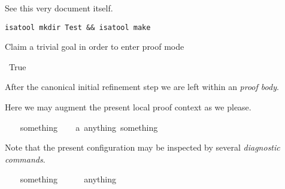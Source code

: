 %
\begin{isabellebody}%
\def\isabellecontext{Tutorial}%
\isamarkupfalse%
%
\isamarkuptrue%
%
\isamarkuptrue%
%
\isamarkuptrue%
%
\isamarkuptrue%
%
\isamarkuptrue%
%
\isamarkuptrue%
%
\isamarkuptrue%
%
\isamarkuptrue%
%
\isamarkuptrue%
%
\isamarkuptrue%
%
\isamarkuptrue%
%
\begin{isamarkuptext}%
See this very document itself.%
\end{isamarkuptext}%
\isamarkuptrue%
%
\isamarkuptrue%
%
\begin{isamarkuptext}%
\verb"isatool mkdir Test && isatool make"%
\end{isamarkuptext}%
\isamarkuptrue%
%
\isamarkuptrue%
%
\isamarkuptrue%
%
\begin{isamarkuptext}%
Claim a trivial goal in order to enter proof mode \isa{{\isasymdots}}%
\end{isamarkuptext}%
\isamarkuptrue%
\ True\isanewline
\isamarkupfalse%
\isamarkupfalse%
%
\begin{isamarkuptxt}%
After the canonical initial refinement step we are left
    within an \emph{proof body}.%
\end{isamarkuptxt}%
\isamarkuptrue%
%
\begin{isamarkuptxt}%
Here we may augment the present local {proof context} as we
    please.%
\end{isamarkuptxt}%
\ \ \isamarkuptrue%
\ something\isanewline
\ \ \isamarkupfalse%
\ a{\isacharcolon}\ {\isachardoublequote}anything\ something{\isachardoublequote}\isamarkupfalse%
%
\begin{isamarkuptxt}%
Note that the present configuration may be inspected by
  several \emph{diagnostic commands}.%
\end{isamarkuptxt}%
\ \ \isamarkuptrue%
\ something\ \ %
\isanewline
\ \ \isamarkupfalse%
\ anything\ \ %

\end{isabellebody}
